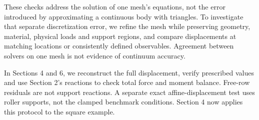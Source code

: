 These checks address the solution of one mesh's equations, not the error
introduced by approximating a continuous body with triangles. To investigate
that separate discretization error, we refine the mesh while preserving
geometry, material, physical loads and support regions, and compare
displacements at matching locations or consistently defined observables.
Agreement between solvers on one mesh is not evidence of continuum accuracy.

In Sections 4 and 6, we reconstruct the full displacement, verify prescribed
values and use Section 2's reactions to check total force and moment balance.
Free-row residuals are not support reactions. A separate exact
affine-displacement test uses roller supports, not the clamped benchmark
conditions. Section 4 now applies this protocol to the square example.
